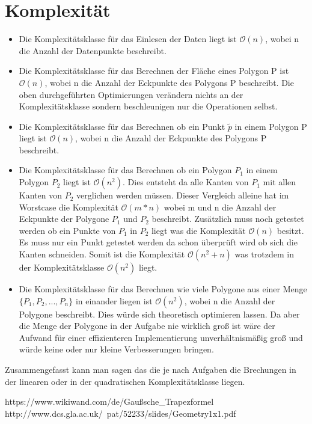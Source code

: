 \documentclass[conference]{IEEEtran}
\begin{document}
	
	\section{Komplexität}
	\begin{itemize}
		\item Die Komplexitätsklasse für das Einlesen der Daten liegt ist $\mathcal{O}(n)$, wobei n die Anzahl der Datenpunkte beschreibt.
		
		\item Die Komplexitätsklasse für das Berechnen der Fläche eines Polygon P ist $\mathcal{O}(n)$, wobei n die Anzahl der Eckpunkte des Polygons P beschreibt. Die oben durchgeführten Optimierungen verändern nichts an der Komplexitätsklasse sondern beschleunigen nur die Operationen selbst.
		
		\item Die Komplexitätsklasse für das Berechnen ob ein Punkt $\tilde{p}$ in einem Polygon P liegt ist $\mathcal{O}(n)$, wobei n die Anzahl der Eckpunkte des Polygons P beschreibt.
		
		\item Die Komplexitätsklasse für das Berechnen ob ein Polygon $P_1$ in einem Polygon $P_2$ liegt ist $\mathcal{O}(n^2)$. Dies entsteht da alle Kanten von $P_1$ mit allen Kanten von $P_2$ verglichen werden müssen. Dieser Vergleich alleine hat im Worstcase die Komplexität $\mathcal{O}(m*n)$  wobei m und n die Anzahl der Eckpunkte der Polygone $P_1$ und $P_2$ beschreibt. Zusätzlich muss noch getestet werden ob ein Punkte von $P_1$ in $P_2$ liegt was die Komplexität $\mathcal{O}(n)$ besitzt. Es muss nur ein Punkt getestet werden da schon überprüft wird ob sich die Kanten schneiden. Somit ist die Komplexität $\mathcal{O}(n^2+n)$ was trotzdem in der Komplexitätsklasse $\mathcal{O}(n^2)$ liegt.
		
		\item Die Komplexitätsklasse für das Berechnen wie viele Polygone aus einer Menge $\{P_1,P_2,...,P_n\}$ in einander liegen ist $\mathcal{O}(n^2)$, wobei n die Anzahl der Polygone beschreibt. Dies würde sich theoretisch optimieren lassen. Da aber die Menge der Polygone in der Aufgabe nie wirklich groß ist wäre der Aufwand für einer effizienteren Implementierung unverhältnismäßig groß und würde keine oder nur kleine Verbesserungen bringen.
	\end{itemize}
	Zusammengefasst kann man sagen das die je nach Aufgaben die Brechungen in der linearen oder in der quadratischen Komplexitätsklasse liegen.
	
	\begin{thebibliography}{00}
		https://www.wikiwand.com/de/Gaußsche\_Trapezformel
		http://www.dcs.gla.ac.uk/~pat/52233/slides/Geometry1x1.pdf
	\end{thebibliography}
	
\end{document}
